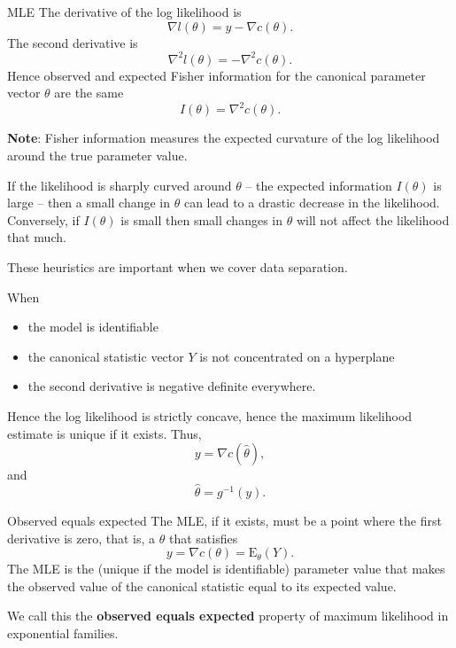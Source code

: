 \documentclass[
  ignorenonframetext,
]{beamer}
\providecommand{\tightlist}{%
  \setlength{\itemsep}{0pt}\setlength{\parskip}{0pt}}
\begin{document}
\begin{frame}{MLE}
\protect\hypertarget{mle}{}
The derivative of the log likelihood is \[
  \nabla l(\theta) = y - \nabla c(\theta).
\] The second derivative is \[
  \nabla^2 l(\theta) = -\nabla^2 c(\theta).
\] Hence observed and expected Fisher information for the canonical
parameter vector \(\theta\) are the same \begin{equation} \label{FI}
    I(\theta) = \nabla^2 c(\theta).
\end{equation}
\end{frame}

\begin{frame}{}
\protect\hypertarget{section}{}
\textbf{Note}: Fisher information measures the expected curvature of the
log likelihood around the true parameter value.

If the likelihood is sharply curved around \(\theta\) -- the expected
information \(I(\theta)\) is large -- then a small change in \(\theta\)
can lead to a drastic decrease in the likelihood. Conversely, if
\(I(\theta)\) is small then small changes in \(\theta\) will not affect
the likelihood that much.

These heuristics are important when we cover data separation.
\end{frame}

\begin{frame}{}
\protect\hypertarget{section-1}{}
When

\begin{itemize}
\tightlist
\item
  the model is identifiable
\item
  the canonical statistic vector \(Y\) is not concentrated on a
  hyperplane
\item
  the second derivative is negative definite everywhere.
\end{itemize}

Hence the log likelihood is strictly concave, hence the maximum
likelihood estimate is unique if it exists. Thus, \[
  y = \nabla c(\hat{\theta}),
\] and \[
  \hat{\theta} = g^{-1}(y).
\]
\end{frame}

\begin{frame}{Observed equals expected}
\protect\hypertarget{observed-equals-expected}{}
The MLE, if it exists, must be a point where the first derivative is
zero, that is, a \(\theta\) that satisfies \[
  y = \nabla c(\theta) = \text{E}_\theta(Y).
\] The MLE is the (unique if the model is identifiable) parameter value
that makes the observed value of the canonical statistic equal to its
expected value.

We call this the \textbf{observed equals expected} property of maximum
likelihood in exponential families.
\end{frame}
\end{document}
